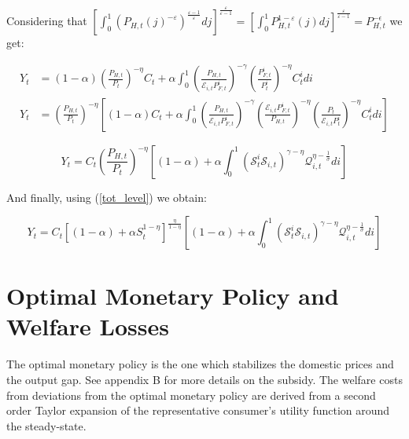 \documentclass{article}
\begin{document}
Considering that $\left[ \int^1_0 \left( P_{H,t}(j)^{-\varepsilon} \right)^{\frac{\varepsilon-1}{\varepsilon}}dj \right]^\frac{\varepsilon}{\varepsilon-1} = \left[ \int^1_0 P_{H,t}^{1-\varepsilon}(j)  dj \right]^\frac{\varepsilon}{\varepsilon-1} = P_{H,t}^{-\epsilon}$ we get:

\begin{equation}
    \begin{split}
        Y_{t} &= (1-\alpha) \left( \frac{P_{H,t}}{P_t} \right)^{-\eta} C_t +  \alpha \int_0^1 \left( \frac{P_{H,t}}{\mathcal{E}_{i,t} P^i_{F,t}} \right)^{-\gamma} \left( \frac{P^i_{F,t}}{P^i_{t}} \right)^{-\eta} C^i_t di \\
        Y_{t} &= \left( \frac{P_{H,t}}{P_t} \right)^{-\eta} \left[(1-\alpha)  C_t +  \alpha \int_0^1 \left( \frac{P_{H,t}}{\mathcal{E}_{i,t} P^i_{F,t}} \right)^{-\gamma}  \left( \frac{\mathcal{E}_{i,t} P^i_{F,t}}{P_{H,t}} \right)^{-\eta} \left(\frac{P_t}{\mathcal E_{i,t} P_t^i} \right)^{-\eta} C^i_t di \right]
    \end{split}
\end{equation}

\begin{equation}
    Y_{t} = C_t \left( \frac{P_{H,t}}{P_t} \right)^{-\eta} \left[(1-\alpha)  +  \alpha \int_0^1 \left(\mathcal S^i_t \mathcal S_{i,t} \right)^{\gamma - \eta} \mathcal Q^{\eta - \frac{1}{\sigma}}_{i,t} di \right] 
\end{equation}

And finally, using (\ref{tot_level}) we obtain:

\begin{equation}
    Y_{t} = C_t \left[(1-\alpha) + \alpha S_t^{1-\eta} \right]^{\frac{\eta}{1-\eta}} \left[(1-\alpha)  +  \alpha \int_0^1 \left(\mathcal S^i_t \mathcal S_{i,t} \right)^{\gamma - \eta} \mathcal Q^{\eta - \frac{1}{\sigma}}_{i,t} di \right] 
\end{equation}

\section{Optimal Monetary Policy and Welfare Losses}

The optimal monetary policy is the one which stabilizes the domestic prices and the output gap. See appendix B for more details on the subsidy. The welfare costs from deviations from the optimal monetary policy are derived from a second order Taylor expansion of the representative consumer's utility function around the steady-state.
\end{document}
